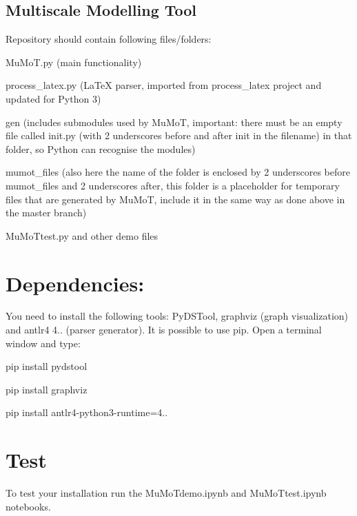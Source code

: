 \subsection*{Multiscale Modelling Tool }

Repository should contain following files/folders\+:
\begin{DoxyItemize}
\item Mu\+Mo\+T.\+py (main functionality)
\item process\+\_\+latex.\+py (La\+TeX parser, imported from process\+\_\+latex project and updated for Python 3)
\item gen (includes submodules used by Mu\+MoT, important\+: there must be an empty file called init.\+py (with 2 underscores before and after init in the filename) in that folder, so Python can recognise the modules)
\item mumot\+\_\+files (also here the name of the folder is enclosed by 2 underscores before mumot\+\_\+files and 2 underscores after, this folder is a placeholder for temporary files that are generated by Mu\+MoT, include it in the same way as done above in the master branch)
\item Mu\+Mo\+Ttest.\+py and other demo files
\end{DoxyItemize}

\section*{Dependencies\+:}

You need to install the following tools\+: Py\+D\+S\+Tool, graphviz (graph visualization) and antlr4 4.. (parser generator). It is possible to use pip. Open a terminal window and type\+:


\begin{DoxyItemize}
\item pip install pydstool
\item pip install graphviz
\item pip install antlr4-\/python3-\/runtime=4..
\end{DoxyItemize}

\section*{Test}

To test your installation run the \textquotesingle{}Mu\+Mo\+Tdemo.\+ipynb\textquotesingle{} and \textquotesingle{}Mu\+Mo\+Ttest.\+ipynb\textquotesingle{} notebooks.

